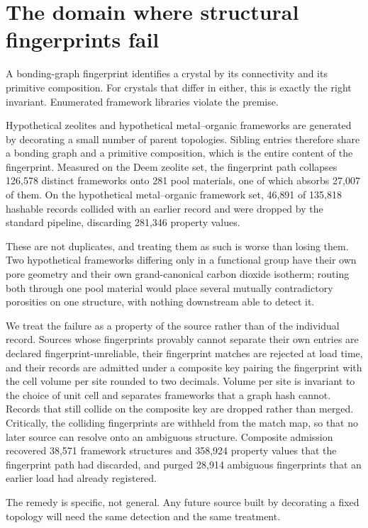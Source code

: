 \section{The domain where structural fingerprints fail}\label{note:fingerprint}

A bonding-graph fingerprint identifies a crystal by its connectivity and its
primitive composition. For crystals that differ in either, this is exactly the
right invariant. Enumerated framework libraries violate the premise.

Hypothetical zeolites and hypothetical metal--organic frameworks are generated by
decorating a small number of parent topologies. Sibling entries therefore share a
bonding graph and a primitive composition, which is the entire content of the
fingerprint. Measured on the Deem zeolite set, the fingerprint path collapses
126{,}578 distinct frameworks onto 281 pool materials, one of which absorbs
27{,}007 of them. On the hypothetical metal--organic framework set, 46{,}891 of
135{,}818 hashable records collided with an earlier record and were dropped by
the standard pipeline, discarding 281{,}346 property values.

These are not duplicates, and treating them as such is worse than losing them.
Two hypothetical frameworks differing only in a functional group have their own
pore geometry and their own grand-canonical carbon dioxide isotherm; routing both
through one pool material would place several mutually contradictory porosities
on one structure, with nothing downstream able to detect it.

We treat the failure as a property of the source rather than of the individual
record. Sources whose fingerprints provably cannot separate their own entries are
declared fingerprint-unreliable, their fingerprint matches are rejected at load
time, and their records are admitted under a composite key pairing the
fingerprint with the cell volume per site rounded to two decimals. Volume per
site is invariant to the choice of unit cell and separates frameworks that a
graph hash cannot. Records that still collide on the composite key are dropped
rather than merged. Critically, the colliding fingerprints are withheld from the
match map, so that no later source can resolve onto an ambiguous structure.
Composite admission recovered 38{,}571 framework structures and 358{,}924
property values that the fingerprint path had discarded, and purged 28{,}914
ambiguous fingerprints that an earlier load had already registered.

The remedy is specific, not general. Any future source built by decorating a
fixed topology will need the same detection and the same treatment.

